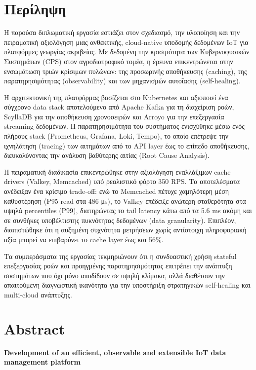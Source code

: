 \chapter*{Περίληψη}

Η παρούσα διπλωματική εργασία εστιάζει στον σχεδιασμό, την υλοποίηση και την
πειραματική αξιολόγηση μιας ανθεκτικής, cloud-native υποδομής δεδομένων IoT για
πλατφόρμες γεωργίας ακριβείας. Με δεδομένη την κρισιμότητα των Κυβερνοφυσικών
Συστημάτων (CPS) στον αγροδιατροφικό τομέα, η έρευνα επικεντρώνεται στην
ενσωμάτωση τριών κρίσιμων πυλώνων: της προσωρινής αποθήκευσης (caching), της
παρατηρησιμότητας (observability) και των μηχανισμών αυτοΐασης (self-healing).

Η αρχιτεκτονική της πλατφόρμας βασίζεται στο Kubernetes και αξιοποιεί ένα
σύγχρονο data stack αποτελούμενο από Apache Kafka για τη διαχείριση ροών,
ScyllaDB για την αποθήκευση χρονοσειρών και Arroyo για την επεξεργασία
streaming δεδομένων. Η παρατηρησιμότητα του συστήματος ενισχύθηκε μέσω ενός
πλήρους stack (Prometheus, Grafana, Loki, Tempo), το οποίο επέτρεψε την
ιχνηλάτηση (tracing) των αιτημάτων από το API layer έως το επίπεδο αποθήκευσης,
διευκολύνοντας την ανάλυση βαθύτερης αιτίας (Root Cause Analysis).

Η πειραματική διαδικασία επικεντρώθηκε στην αξιολόγηση εναλλάξιμων cache
drivers (Valkey, Memcached) υπό ρεαλιστικό φόρτο 350 RPS. Τα αποτελέσματα
ανέδειξαν ένα κρίσιμο trade-off: ενώ το Memcached πέτυχε χαμηλότερη μέση
καθυστέρηση (P95 read στα 486 μs), το Valkey επέδειξε ανώτερη σταθερότητα στα
υψηλά percentiles (P99), διατηρώντας το tail latency κάτω από τα 5.6 ms ακόμη
και σε συνθήκες υποβέλτιστης πυκνότητας δεδομένων (data granularity). Επιπλέον,
διαπιστώθηκε ότι η αυξημένη συχνότητα μετρήσεων χωρίς αντίστοιχη πληροφοριακή
αξία μπορεί να επιβαρύνει το cache layer έως και 56\%.

Τα συμπεράσματα της εργασίας τεκμηριώνουν ότι η συνδυαστική χρήση stateful
επεξεργασίας ροών και προηγμένης παρατηρησιμότητας επιτρέπει την ανάπτυξη
συστημάτων που όχι μόνο αποδίδουν σε υψηλή κλίμακα, αλλά διαθέτουν την
απαιτούμενη διαγνωστική ικανότητα για την υποστήριξη στρατηγικών self-healing
και multi-cloud ανάπτυξης.

\chapter*{Abstract}

\begin{center}
	{\large\textbf{Development of an efficient, observable and extensible IoT data management platform}}
\end{center}

